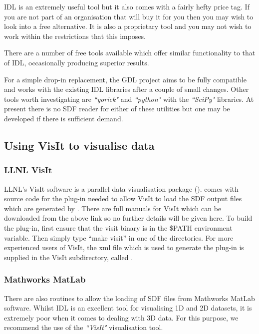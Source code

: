   IDL is an extremely useful tool but it also comes with a fairly hefty
  price tag. If you are not part of an organisation that will buy it for
  you then you may wish to look into a free alternative. It is also a
  proprietary tool and you may not wish to work within the restrictions
  that this imposes.

  There are a number of free tools available which offer similar functionality
  to that of IDL, occasionally producing superior results.

  For a simple drop-in replacement, the GDL project aims to be fully compatible
  and works with the existing {\EPOCH} IDL libraries after a couple of small
  changes. Other tools worth investigating are {\em ``yorick"} and
  {\em ``python"} with the {\em ``SciPy"} libraries. At present there is
  no SDF reader for either of these utilities but one may be developed if
  there is sufficient demand.

\subsection{Using VisIt to visualise data}

\subsubsection{LLNL VisIt}
LLNL's VisIt software is a parallel data visualisation package
(). {\EPOCH} comes with source
code for the plug-in needed to allow VisIt to load the SDF output files which
are generated by {\EPOCH}. There are full manuals for VisIt which can be
downloaded from the above link so no further details will be given here. To
build the plug-in, first ensure that the visit binary is in the \$PATH
environment variable. Then simply type ``make visit'' in one of the
 directories.
For more experienced
users of VisIt, the xml file which is used to generate the plug-in is supplied
in the VisIt subdirectory, called .

\subsubsection{Mathworks MatLab}
There are also routines to allow the loading of SDF files from Mathworks
MatLab software.
  Whilst IDL is an excellent tool for visualising 1D and 2D datasets, it
  is extremely poor when it comes to dealing with 3D data. For this purpose,
  we recommend the use of the {\em ``VisIt"} visualisation tool.

